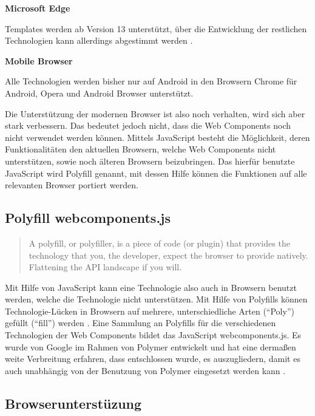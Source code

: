 \textbf{Microsoft Edge}

Templates werden ab Version 13 unterstützt, über die Entwicklung der restlichen Technologien kann allerdings abgestimmt werden \cite{citeulike:13914237}.

\textbf{Mobile Browser}

Alle Technologien werden bisher nur auf Android in den Browsern Chrome für Android, Opera und Android Browser unterstützt.

Die Unterstützung der modernen Browser ist also noch verhalten, wird sich aber stark verbessern. Das bedeutet jedoch nicht, dass die Web Components noch nicht verwendet werden können. Mittels JavaScript besteht die Möglichkeit, deren Funktionalitäten den aktuellen Browsern, welche Web Components nicht unterstützen, sowie noch älteren Browsern beizubringen. Das hierfür benutzte JavaScript wird Polyfill genannt, mit dessen Hilfe können die Funktionen auf alle relevanten Browser portiert werden.


\subsection{Polyfill webcomponents.js}\label{polyfill-webcomponents.js}

\begin{quote}
A polyfill, or polyfiller, is a piece of code (or plugin) that provides the technology that you, the developer, expect the browser to provide natively. Flattening the API landscape if you will. \cite{citeulike:13914241}
\end{quote}

Mit Hilfe von JavaScript kann eine Technologie also auch in Browsern benutzt werden, welche die Technologie nicht unterstützen. Mit Hilfe von Polyfills können Technologie-Lücken in Browsern auf mehrere, unterschiedliche Arten (``Poly'') gefüllt (``fill'') werden \cite{citeulike:13914234}. Eine Sammlung an Polyfills für die verschiedenen Technologien der Web Components bildet das JavaScript webcomponents.js. Es wurde von Google im Rahmen von Polymer entwickelt und hat eine dermaßen weite Verbreitung erfahren, dass entschlossen wurde, es auszugliedern, damit es auch unabhängig von der Benutzung von Polymer eingesetzt werden kann \cite{citeulike:13914239}.


\subsection{Browserunterstüzung}\label{browserunterstuxfczung}

